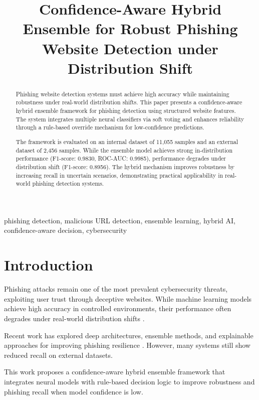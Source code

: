 ﻿\documentclass[conference]{IEEEtran}
\title{Confidence-Aware Hybrid Ensemble for Robust Phishing Website Detection under Distribution Shift}
\author{}
\begin{document}
\maketitle

\begin{abstract}
Phishing website detection systems must achieve high accuracy while maintaining robustness under real-world distribution shifts. This paper presents a confidence-aware hybrid ensemble framework for phishing detection using structured website features. The system integrates multiple neural classifiers via soft voting and enhances reliability through a rule-based override mechanism for low-confidence predictions.

The framework is evaluated on an internal dataset of 11,055 samples and an external dataset of 2,456 samples. While the ensemble model achieves strong in-distribution performance (F1-score: 0.9830, ROC-AUC: 0.9985), performance degrades under distribution shift (F1-score: 0.8956). The hybrid mechanism improves robustness by increasing recall in uncertain scenarios, demonstrating practical applicability in real-world phishing detection systems.
\end{abstract}

\begin{IEEEkeywords}
phishing detection, malicious URL detection, ensemble learning, hybrid AI, confidence-aware decision, cybersecurity
\end{IEEEkeywords}

\section{Introduction}
Phishing attacks remain one of the most prevalent cybersecurity threats, exploiting user trust through deceptive websites. While machine learning models achieve high accuracy in controlled environments, their performance often degrades under real-world distribution shifts \cite{jisa2023highaccuracy,ghalechyan2024neural,zhou2025enlem}.

Recent work has explored deep architectures, ensemble methods, and explainable approaches for improving phishing resilience \cite{he2024tinybert,aslam2024antiphishstack,kehkashan2025explainable,remya2025bglphishnet}. However, many systems still show reduced recall on external datasets.

This work proposes a confidence-aware hybrid ensemble framework that integrates neural models with rule-based decision logic to improve robustness and phishing recall when model confidence is low.
\end{document}
